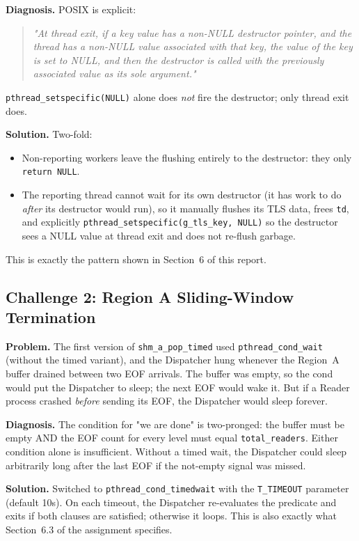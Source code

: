 \documentclass[11pt,a4paper]{article}
\newcommand{\code}[1]{\texttt{\small #1}}
\begin{document}
\textbf{Diagnosis.} POSIX is explicit:
\begin{quote}\itshape
"At thread exit, if a key value has a non-NULL destructor pointer, and
the thread has a non-NULL value associated with that key, the value of
the key is set to NULL, and then the destructor is called with the
previously associated value as its sole argument."
\end{quote}
\code{pthread\_setspecific(NULL)} alone does \emph{not} fire the
destructor; only thread exit does.

\textbf{Solution.} Two-fold:
\begin{itemize}
    \item Non-reporting workers leave the flushing entirely to the
        destructor: they only \code{return NULL}.
    \item The reporting thread cannot wait for its own destructor (it
        has work to do \emph{after} its destructor would run), so it
        manually flushes its TLS data, frees \code{td}, and explicitly
        \code{pthread\_setspecific(g\_tls\_key, NULL)} so the
        destructor sees a NULL value at thread exit and does not
        re-flush garbage.
\end{itemize}
This is exactly the pattern shown in Section~6 of this report.

\subsection{Challenge 2: Region A Sliding-Window Termination}

\textbf{Problem.} The first version of \code{shm\_a\_pop\_timed} used
\code{pthread\_cond\_wait} (without the timed variant), and the
Dispatcher hung whenever the Region~A buffer drained between two EOF
arrivals. The buffer was empty, so the cond would put the Dispatcher to
sleep; the next EOF would wake it. But if a Reader process crashed
\emph{before} sending its EOF, the Dispatcher would sleep forever.

\textbf{Diagnosis.} The condition for "we are done" is two-pronged:
the buffer must be empty AND the EOF count for every level must equal
\code{total\_readers}. Either condition alone is insufficient. Without
a timed wait, the Dispatcher could sleep arbitrarily long after the
last EOF if the not-empty signal was missed.

\textbf{Solution.} Switched to \code{pthread\_cond\_timedwait} with the
\code{T\_TIMEOUT} parameter (default 10s). On each timeout, the
Dispatcher re-evaluates the predicate and exits if both clauses are
satisfied; otherwise it loops. This is also exactly what Section~6.3
of the assignment specifies.
\end{document}
